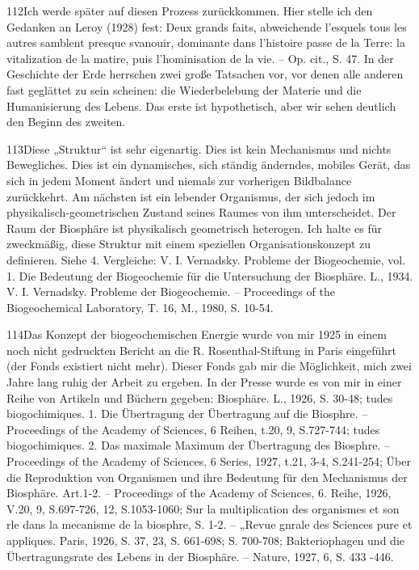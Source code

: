 \documentclass[11pt,a4paper]{book}
\begin{document}
112Ich werde später auf diesen Prozess zurückkommen. Hier stelle ich den Gedanken an Leroy (1928) fest: Deux grands faits, abweichende l'esquels tous les autres samblent presque svanouir, dominante dans l'histoire passe de la Terre: la vitalization de la matire, puis l'hominisation de la vie. -- Op. cit., S. 47. In der Geschichte der Erde herrschen zwei große Tatsachen vor, vor denen alle anderen fast geglättet zu sein scheinen: die Wiederbelebung der Materie und die Humanisierung des Lebens. Das erste ist hypothetisch, aber wir sehen deutlich den Beginn des zweiten.



113Diese „Struktur“ ist sehr eigenartig. Dies ist kein Mechanismus und nichts Bewegliches. Dies ist ein dynamisches, sich ständig änderndes, mobiles Gerät, das sich in jedem Moment ändert und niemals zur vorherigen Bildbalance zurückkehrt. Am nächsten ist ein lebender Organismus, der sich jedoch im physikalisch-geometrischen Zustand seines Raumes von ihm unterscheidet. Der Raum der Biosphäre ist physikalisch geometrisch heterogen. Ich halte es für zweckmäßig, diese Struktur mit einem speziellen Organisationskonzept zu definieren. Siehe 4. Vergleiche: V. I. Vernadsky. Probleme der Biogeochemie, vol. 1. Die Bedeutung der Biogeochemie für die Untersuchung der Biosphäre. L., 1934. V. I. Vernadsky. Probleme der Biogeochemie. -- Proceedings of the Biogeochemical Laboratory, T. 16, M., 1980, S. 10-54.



114Das Konzept der biogeochemischen Energie wurde von mir 1925 in einem noch nicht gedruckten Bericht an die R. Rosenthal-Stiftung in Paris eingeführt (der Fonds existiert nicht mehr). Dieser Fonds gab mir die Möglichkeit, mich zwei Jahre lang ruhig der Arbeit zu ergeben. In der Presse wurde es von mir in einer Reihe von Artikeln und Büchern gegeben: Biosphäre. L., 1926, S. 30-48; tudes biogochimiques. 1. Die Übertragung der Übertragung auf die Biosphre. -- Proceedings of the Academy of Sciences, 6 Reihen, t.20, 9, S.727-744; tudes biogochimiques. 2. Das maximale Maximum der Übertragung des Biosphre. -- Proceedings of the Academy of Sciences, 6 Series, 1927, t.21, 3-4, S.241-254; Über die Reproduktion von Organismen und ihre Bedeutung für den Mechanismus der Biosphäre. Art.1-2. -- Proceedings of the Academy of Sciences, 6. Reihe, 1926, V.20, 9, S.697-726, 12, S.1053-1060; Sur la multiplication des organismes et son rle dans la mecanisme de la biosphre, S. 1-2. -- „Revue gnrale des Sciences pure et appliques. Paris, 1926, S. 37, 23, S. 661-698; S. 700-708; Bakteriophagen und die Übertragungsrate des Lebens in der Biosphäre. -- Nature, 1927, 6, S. 433 -446.
\end{document}

